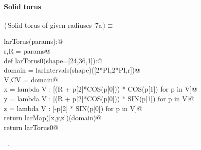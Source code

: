 \documentclass[11pt,oneside]{article}	%
\begin{document}
\paragraph{Solid torus}
\begin{flushleft} \small \label{scrap14}
\protect{}$\langle\,$Solid torus of given radiuses\nobreak\ {\footnotesize 7a}$\,\rangle\equiv$
\vspace{-1ex}
\begin{list}{}{} \item
\mbox{}\verb@def larTorus(params):@\\
\mbox{}\verb@   r,R = params@\\
\mbox{}\verb@   def larTorus0(shape=[24,36,1]):@\\
\mbox{}\verb@      domain = larIntervals(shape)([2*PI,2*PI,r])@\\
\mbox{}\verb@      V,CV = domain@\\
\mbox{}\verb@      x = lambda V : [(R + p[2]*COS(p[0])) * COS(p[1]) for p in V]@\\
\mbox{}\verb@      y = lambda V : [(R + p[2]*COS(p[0])) * SIN(p[1]) for p in V]@\\
\mbox{}\verb@      z = lambda V : [-p[2] * SIN(p[0]) for p in V]@\\
\mbox{}\verb@      return larMap([x,y,z])(domain)@\\
\mbox{}\verb@   return larTorus0@\\
\mbox{}\verb@@{\NWsep}
\end{list}
\vspace{-1ex}
\footnotesize\addtolength{\baselineskip}{-1ex}
\begin{list}{}{\setlength{\itemsep}{-\parsep}\setlength{\itemindent}{-\leftmargin}}
\item \NWtxtMacroRefIn\ .
\end{list}
\end{flushleft}
\end{document}
